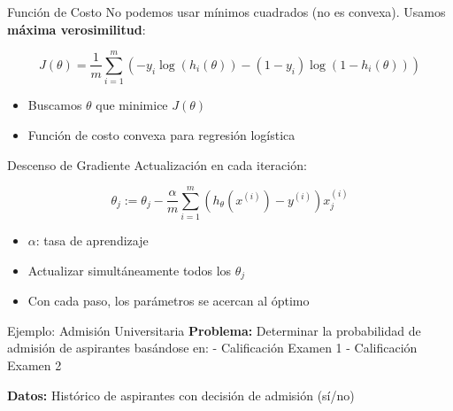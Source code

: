 \documentclass[
  ignorenonframetext,
]{beamer}
\providecommand{\tightlist}{%
  \setlength{\itemsep}{0pt}\setlength{\parskip}{0pt}}
\begin{document}
\begin{frame}
\begin{block}{Función de Costo}
\label{funciuxf3n-de-costo}
No podemos usar mínimos cuadrados (no es convexa). Usamos \textbf{máxima
verosimilitud}:

\[J(\theta) = \frac{1}{m}\sum_{i=1}^m\left(-y_i \log(h_i(\theta)) - (1-y_i)\log(1-h_i(\theta))\right)\]

\begin{itemize}
\tightlist
\item
  Buscamos \(\theta\) que minimice \(J(\theta)\)
\item
  Función de costo convexa para regresión logística
\end{itemize}
\end{block}
\end{frame}

\begin{frame}
\begin{block}{Descenso de Gradiente}
\label{descenso-de-gradiente}
Actualización en cada iteración:

\[\theta_j := \theta_j - \frac{\alpha}{m} \sum_{i=1}^{m} (h_\theta(x^{(i)}) - y^{(i)}) x_j^{(i)}\]

\begin{itemize}
\tightlist
\item
  \(\alpha\): tasa de aprendizaje
\item
  Actualizar simultáneamente todos los \(\theta_j\)
\item
  Con cada paso, los parámetros se acercan al óptimo
\end{itemize}
\end{block}
\end{frame}

\begin{frame}
\begin{block}{Ejemplo: Admisión Universitaria}
\label{ejemplo-admisiuxf3n-universitaria}
\textbf{Problema:} Determinar la probabilidad de admisión de aspirantes
basándose en: - Calificación Examen 1 - Calificación Examen 2

\textbf{Datos:} Histórico de aspirantes con decisión de admisión (sí/no)
\end{block}
\end{frame}
\end{document}
